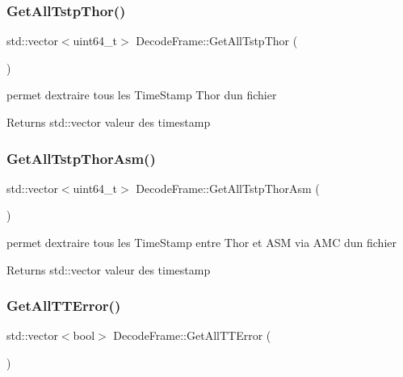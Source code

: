 \subsubsection{\texorpdfstring{Get\+All\+Tstp\+Thor()}{GetAllTstpThor()}}
{\footnotesize\ttfamily std\+::vector$<$uint64\+\_\+t$>$ Decode\+Frame\+::\+Get\+All\+Tstp\+Thor (\begin{DoxyParamCaption}{ }\end{DoxyParamCaption})\hspace{0.3cm}{\ttfamily [inline]}}



permet d\textquotesingle{}extraire tous les Time\+Stamp Thor d\textquotesingle{}un fichier 

\begin{DoxyReturn}{Returns}
std\+::vector valeur des timestamp 
\end{DoxyReturn}
\mbox{\label{classDecodeFrame_a93dc46d04d8ccfbb75284dfaf72b5b25}} 
\subsubsection{\texorpdfstring{Get\+All\+Tstp\+Thor\+Asm()}{GetAllTstpThorAsm()}}
{\footnotesize\ttfamily std\+::vector$<$uint64\+\_\+t$>$ Decode\+Frame\+::\+Get\+All\+Tstp\+Thor\+Asm (\begin{DoxyParamCaption}{ }\end{DoxyParamCaption})\hspace{0.3cm}{\ttfamily [inline]}}



permet d\textquotesingle{}extraire tous les Time\+Stamp entre Thor et A\+SM via A\+MC d\textquotesingle{}un fichier 

\begin{DoxyReturn}{Returns}
std\+::vector valeur des timestamp 
\end{DoxyReturn}
\mbox{\label{classDecodeFrame_af5305c10c1bf439b864428f2f19e546c}} 
\subsubsection{\texorpdfstring{Get\+All\+T\+T\+Error()}{GetAllTTError()}}
{\footnotesize\ttfamily std\+::vector$<$bool$>$ Decode\+Frame\+::\+Get\+All\+T\+T\+Error (\begin{DoxyParamCaption}{ }\end{DoxyParamCaption})\hspace{0.3cm}{\ttfamily [inline]}}



